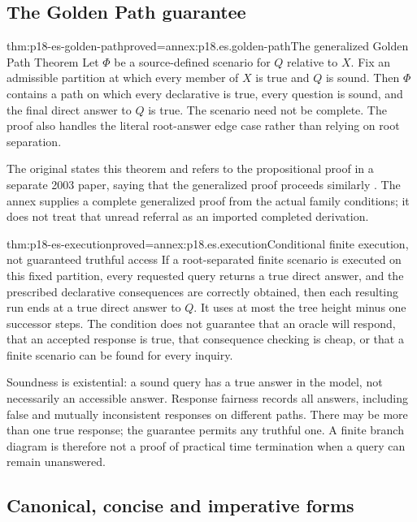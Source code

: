 \subsection{The Golden Path guarantee}

\begin{hbtheorem}{thm:p18-es-golden-path}{proved=annex:p18.es.golden-path}{The generalized Golden Path Theorem}
Let \(\Phi\) be a source-defined scenario for \(Q\) relative to \(X\).
Fix an admissible partition at which every member of \(X\) is true and
\(Q\) is sound. Then \(\Phi\) contains a path on which every declarative
is true, every question is sound, and the final direct answer to \(Q\) is true.
The scenario need not be complete. The proof also handles the literal
root-answer edge case rather than relying on root separation.
\end{hbtheorem}

The original states this theorem and refers to the propositional proof in
a separate 2003 paper, saying that the generalized proof proceeds similarly
\cite[p.~36]{Wisniewski2001QuestionsInferences}. The annex supplies a complete
generalized proof from the actual family conditions; it does not treat that
unread referral as an imported completed derivation.

\begin{hbcorollary}{thm:p18-es-execution}{proved=annex:p18.es.execution}{Conditional finite execution, not guaranteed truthful access}
If a root-separated finite scenario is executed on this fixed partition,
every requested query returns a true direct answer, and the prescribed
declarative consequences are correctly obtained, then each resulting run
ends at a true direct answer to \(Q\). It uses at most the tree height minus
one successor steps. The condition does not guarantee that an oracle will
respond, that an accepted response is true, that consequence checking is
cheap, or that a finite scenario can be found for every inquiry.
\end{hbcorollary}

Soundness is existential: a sound query has a true answer in the model, not
necessarily an accessible answer. Response fairness records all answers,
including false and mutually inconsistent responses on different paths.
There may be more than one true response; the guarantee permits any truthful
one. A finite branch diagram is therefore not a proof of practical time
termination when a query can remain unanswered.

\subsection{Canonical, concise and imperative forms}

